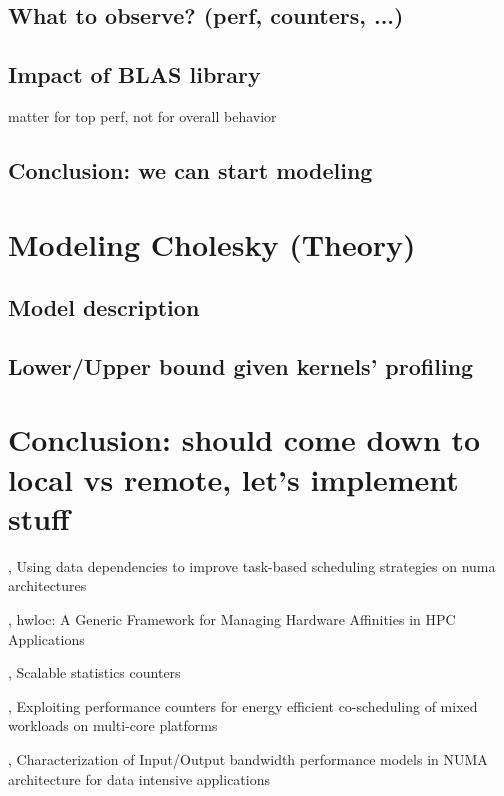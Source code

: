 \subsection{What to observe? (perf, counters, ...)}
\subsection{Impact of BLAS library}
matter for top perf, not for overall behavior

\subsection{Conclusion: we can start modeling}

\section{Modeling Cholesky (Theory)}
\subsection{Model description}
\subsection{Lower/Upper bound given kernels' profiling}

\section{Conclusion: should come down to local vs remote, let's implement stuff}

%
\cite{Virouleau2016b}, Using data dependencies to improve task-based scheduling strategies on numa architectures

\cite{Broquedis2010}, hwloc: {A} Generic Framework for Managing Hardware Affinities in {HPC} Applications


\cite{Dice2013}, Scalable statistics counters

\cite{Libutti2014}, Exploiting performance counters for energy efficient co-scheduling of mixed workloads on multi-core platforms

\cite{Li2013}, Characterization of Input/Output bandwidth performance models in NUMA architecture for data intensive applications

